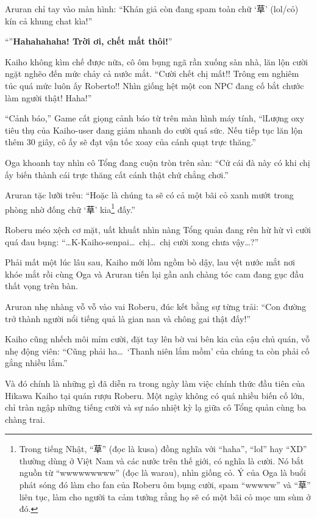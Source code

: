 \documentclass[../main.tex]{subfiles}
\begin{document}
Aruran chỉ tay vào màn hình: ``Khán giả còn đang spam toàn chữ `草' (lol/cỏ) kín cả khung chat kìa!''

``''\textbf{Hahahahaha! Trời ơi, chết mất thôi!}''

Kaiho không kìm chế được nữa, cô ôm bụng ngã rần xuống sàn nhà, lăn lộn cười ngặt nghẽo đến mức chảy cả nước mắt. ``Cười chết chị mất!! Trông em nghiêm túc quá mức luôn ấy Roberto!! Nhìn giống hệt một con NPC đang cố bắt chước làm người thật! Haha!''

``Cảnh báo,'' Game cất giọng cảnh báo từ trên màn hình máy tính, ``lLượng oxy tiêu thụ của Kaiho-user đang giảm nhanh do cười quá sức. Nếu tiếp tục lăn lộn thêm 30 giây, cô ấy sẽ đạt vận tốc xoay của cánh quạt trực thăng.''

Oga khoanh tay nhìn cô Tổng đang cuộn tròn trên sàn: ``Cứ cái đà này có khi chị ấy biến thành cái trực thăng cất cánh thật chứ chẳng chơi.''

Aruran tặc lưỡi trêu: ``Hoặc là chúng ta sẽ có cả một bãi cỏ xanh mướt trong phòng nhờ đống chữ `草' kia\footnote{Trong tiếng Nhật, ``草'' (đọc là kusa) đồng nghĩa với ``haha'', ``lol'' hay ``XD'' thường dùng ở Việt Nam và các nước trên thế giới, có nghĩa là cười. Nó bắt nguồn từ ``wwwwwwwww'' (đọc là warau), nhìn giống cỏ. Ý của Oga là buổi phát sóng đó làm cho fan của Roberu ôm bụng cười, spam ``wwwww'' và ``草'' liên tục, làm cho người ta cảm tưởng rằng họ sẽ có một bãi cỏ mọc um sùm ở đó.} đấy.''

Roberu méo xệch cơ mặt, uất khuất nhìn nàng Tổng quản đang rên hừ hừ vì cười quá đau bụng: ``\dots K-Kaiho-senpai\dots\ chị\dots\ chị cười xong chưa vậy\dots?''

Phải mất một lúc lâu sau, Kaiho mới lồm ngồm bò dậy, lau vệt nước mắt nơi khóe mắt rồi cùng Oga và Aruran tiến lại gần anh chàng tóc cam đang gục đầu thất vọng trên bàn.

Aruran nhẹ nhàng vỗ vỗ vào vai Roberu, đúc kết bằng sự từng trải: ``Con đường trở thành người nổi tiếng quả là gian nan và chông gai thật đấy!''

Kaiho cũng nhếch môi mỉm cười, đặt tay lên bờ vai bên kia của cậu chủ quán, vỗ nhẹ động viên: ``Cũng phải ha\dots\ `Thanh niên lắm mồm' của chúng ta còn phải cố gắng nhiều lắm.''

Và đó chính là những gì đã diễn ra trong ngày làm việc chính thức đầu tiên của Hikawa Kaiho tại quán rượu Roberu. Một ngày không có quá nhiều biến cố lớn, chỉ tràn ngập những tiếng cười và sự náo nhiệt kỳ lạ giữa cô Tổng quản cùng ba chàng trai.
\end{document}
